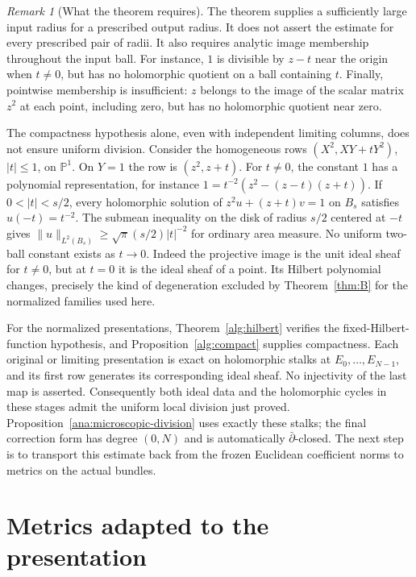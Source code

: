 \documentclass[11pt,reqno]{amsart}
\numberwithin{equation}{section}
\theoremstyle{definition}
\theoremstyle{remark}
\newtheorem{remark}[theorem]{Remark}
\newcommand{\Pj}{\mathbb P}
\begin{document}
\begin{remark}[What the theorem requires]
The theorem supplies a sufficiently large input radius for a
prescribed output radius. It does not assert the estimate for
every prescribed pair of radii. It also requires analytic image
membership throughout the input ball. For instance, \(1\) is
divisible by \(z-t\) near the origin when \(t\neq0\), but has no
holomorphic quotient on a ball containing \(t\). Finally,
pointwise membership is insufficient: \(z\) belongs to the
image of the scalar matrix \(z^2\) at each point, including
zero, but has no holomorphic quotient near zero.

The compactness hypothesis alone, even with independent limiting columns,
does not ensure uniform division. Consider the homogeneous rows
$(X^2,XY+tY^2)$, $|t|\leq1$, on $\Pj^1$. On $Y=1$ the row is
$(z^2,z+t)$. For $t\ne0$, the constant $1$ has a polynomial
representation, for instance
$1=t^{-2}(z^2-(z-t)(z+t))$. If $0<|t|<s/2$, every holomorphic
solution of $z^2u+(z+t)v=1$ on $B_s$ satisfies $u(-t)=t^{-2}$.
The submean inequality on the disk of radius $s/2$ centered at $-t$
gives $\|u\|_{L^2(B_s)}\geq\sqrt\pi(s/2)|t|^{-2}$ for ordinary
area measure. No uniform two-ball constant exists as $t\to0$.
Indeed the projective image is the unit ideal sheaf for $t\ne0$,
but at $t=0$ it is the ideal sheaf of a point. Its Hilbert polynomial
changes, precisely the kind of degeneration excluded by
Theorem~\ref{thm:B} for the normalized families used here.
\end{remark}

For the normalized presentations, Theorem~\ref{alg:hilbert}
verifies the fixed-Hilbert-function hypothesis, and
Proposition~\ref{alg:compact} supplies compactness. Each original
or limiting presentation is exact on holomorphic stalks at
$E_0,\ldots,E_{N-1}$, and its first row generates its corresponding
ideal sheaf. No injectivity of the last map is asserted. Consequently
both ideal data and the holomorphic cycles in these stages admit the
uniform local division just proved. Proposition~\ref{ana:microscopic-division}
uses exactly these stalks; the final correction form has degree $(0,N)$
and is automatically $\bar\partial$-closed. The next step is to
transport this estimate back from the frozen Euclidean
coefficient norms to metrics on the actual bundles.



\section{Metrics adapted to the presentation}
\label{ana:metrics}
\end{document}
